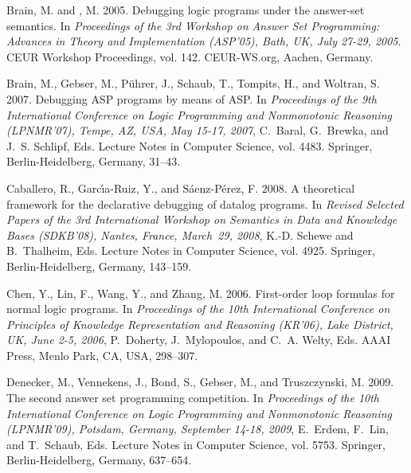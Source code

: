 \documentclass{tlp}
\begin{document}
\begin{thebibliography}{}

{\sc Brain, M.} {\sc and} {, M.} 2005.
\newblock Debugging logic programs under the answer-set semantics.
\newblock In {\em Proceedings of the 3rd Workshop on Answer Set Programming:
  Advances in Theory and Implementation {\rm (}ASP'05{\rm )}, Bath, UK, July
  27-29, 2005}. CEUR Workshop Proceedings, vol. 142. CEUR-WS.org, Aachen,
  Germany.

{\sc Brain, M.}, {\sc Gebser, M.}, {\sc P{\"u}hrer, J.}, {\sc Schaub, T.}, {\sc
  Tompits, H.}, {\sc and} {\sc Woltran, S.} 2007.
\newblock Debugging {ASP} programs by means of {ASP}.
\newblock In {\em Proceedings of the 9th International Conference on Logic
  Programming and Nonmonotonic Reasoning {\rm (}LPNMR'07{\rm )}, Tempe, {AZ},
  {USA}, May 15-17, 2007}, {C.~Baral}, {G.~Brewka}, {and} {J.~S. Schlipf}, Eds.
  Lecture Notes in Computer Science, vol. 4483. Springer, Berlin-Heidelberg,
  Germany, 31--43.

{\sc Caballero, R.}, {\sc Garc\'{\i}a-Ruiz, Y.}, {\sc and} {\sc
  S{\'a}enz-P{\'e}rez, F.} 2008.
\newblock A theoretical framework for the declarative debugging of datalog
  programs.
\newblock In {\em Revised Selected Papers of the 3rd International Workshop on
  Semantics in Data and Knowledge Bases {\rm (}SDKB'08{\rm )}, Nantes, France,
  March~29, 2008}, {K.-D. Schewe} {and} {B.~Thalheim}, Eds. Lecture Notes in
  Computer Science, vol. 4925. Springer, Berlin-Heidelberg, Germany, 143--159.

{\sc Chen, Y.}, {\sc Lin, F.}, {\sc Wang, Y.}, {\sc and} {\sc Zhang, M.} 2006.
\newblock First-order loop formulas for normal logic programs.
\newblock In {\em Proceedings of the 10th International Conference on
  Principles of Knowledge Representation and Reasoning {\rm (}KR'06{\rm )},
  Lake District, UK, June 2-5, 2006}, {P.~Doherty}, {J.~Mylopoulos}, {and}
  {C.~A. Welty}, Eds. AAAI Press, Menlo Park, CA, USA, 298--307.

{\sc Denecker, M.}, {\sc Vennekens, J.}, {\sc Bond, S.}, {\sc Gebser, M.}, {\sc
  and} {\sc Truszczynski, M.} 2009.
\newblock The second answer set programming competition.
\newblock In {\em Proceedings of the 10th International Conference on Logic
  Programming and Nonmonotonic Reasoning {\rm (}LPNMR'09{\rm )}, Potsdam,
  Germany, September 14-18, 2009}, {E.~Erdem}, {F.~Lin}, {and} {T.~Schaub},
  Eds. Lecture Notes in Computer Science, vol. 5753. Springer,
  Berlin-Heidelberg, Germany, 637--654.


\end{thebibliography}
\end{document}
